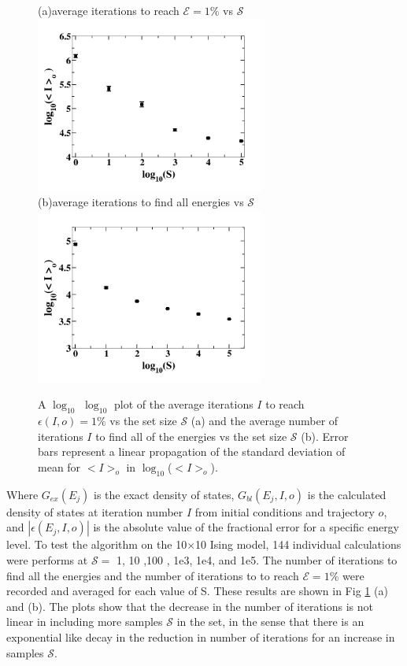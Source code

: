 \documentclass[aps,prl,reprint,superscriptaddress,showkeys]{revtex4-1}
\begin{document}
\begin{figure}[h!]
(a)\hspace{0.1cm}average iterations to reach $\mathcal{E}=1\%$ vs $\mathcal{S}$\\
\includegraphics[width=7.5cm]{its_vs_S.png}\\
(b)\hspace{0.1cm}average iterations to find all energies vs $\mathcal{S}$\\
\includegraphics[width=7.5cm]{its_to_find.png}
\caption{\label{its_to}A $\log_{10}$ $\log_{10}$  plot of the average iterations $I$ to reach $\epsilon(I,o)=1\%$ vs the set size $\mathcal{S}$ (a) and the average number of iterations $I$ to find all of the energies vs the set size $\mathcal{S}$ (b). Error bars represent a linear propagation of the standard deviation of mean for $<I>_o$ in $\log_{10}$($<I>_o$). }
\end{figure}
Where $G_{ex}(E_j)$ is the exact density of states, $G_{bl}(E_j,I,o)$ is the calculated density of states  at iteration number $I$ from initial conditions and trajectory $o$, and $|\epsilon(E_j,I,o)|$ is the absolute value of the fractional error for a specific energy level. To test the algorithm on the 10$\times$10 Ising model, 144 individual calculations were performs at  $\mathcal{S}=$ 1, 10 ,100 , 1e3,  1e4, and 1e5. The number of iterations to find all the energies and the number of iterations to to reach $\mathcal{E}=1\%$ were recorded and averaged for each value of S. These results are shown in Fig \ref{its_to}  (a) and (b).  The plots show that the decrease in the number of iterations is not linear in including more samples $\mathcal{S}$ in the set, in the sense that there is an exponential like decay in the reduction in number of  iterations for an increase in samples $\mathcal{S}$.  
\end{document}
